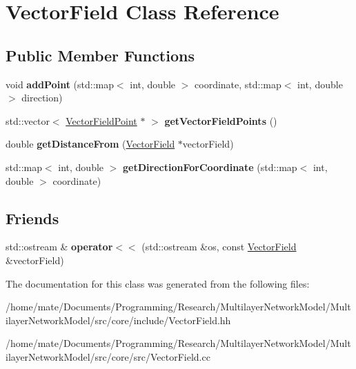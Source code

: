 \hypertarget{classVectorField}{}\section{Vector\+Field Class Reference}
\label{classVectorField}
\subsection*{Public Member Functions}
\begin{DoxyCompactItemize}
\item 
void {\bfseries add\+Point} (std\+::map$<$ int, double $>$ coordinate, std\+::map$<$ int, double $>$ direction)\hypertarget{classVectorField_ac72253d7b3410d3ef4ea520fded2d1f1}{}\label{classVectorField_ac72253d7b3410d3ef4ea520fded2d1f1}

\item 
std\+::vector$<$ \hyperlink{classVectorFieldPoint}{Vector\+Field\+Point} $\ast$ $>$ {\bfseries get\+Vector\+Field\+Points} ()\hypertarget{classVectorField_a79f35e239c04f89a3987f8ae70b49ef9}{}\label{classVectorField_a79f35e239c04f89a3987f8ae70b49ef9}

\item 
double {\bfseries get\+Distance\+From} (\hyperlink{classVectorField}{Vector\+Field} $\ast$vector\+Field)\hypertarget{classVectorField_a9cf9f0a60b62422a406a8530e10ed402}{}\label{classVectorField_a9cf9f0a60b62422a406a8530e10ed402}

\item 
std\+::map$<$ int, double $>$ {\bfseries get\+Direction\+For\+Coordinate} (std\+::map$<$ int, double $>$ coordinate)\hypertarget{classVectorField_ae8f028240c6b4ba60815660a887b92a4}{}\label{classVectorField_ae8f028240c6b4ba60815660a887b92a4}

\end{DoxyCompactItemize}
\subsection*{Friends}
\begin{DoxyCompactItemize}
\item 
std\+::ostream \& {\bfseries operator$<$$<$} (std\+::ostream \&os, const \hyperlink{classVectorField}{Vector\+Field} \&vector\+Field)\hypertarget{classVectorField_a305be31f220fc6801fa91592e7a08a9b}{}\label{classVectorField_a305be31f220fc6801fa91592e7a08a9b}

\end{DoxyCompactItemize}


The documentation for this class was generated from the following files\+:\begin{DoxyCompactItemize}
\item 
/home/mate/\+Documents/\+Programming/\+Research/\+Multilayer\+Network\+Model/\+Multilayer\+Network\+Model/src/core/include/Vector\+Field.\+hh\item 
/home/mate/\+Documents/\+Programming/\+Research/\+Multilayer\+Network\+Model/\+Multilayer\+Network\+Model/src/core/src/Vector\+Field.\+cc\end{DoxyCompactItemize}
